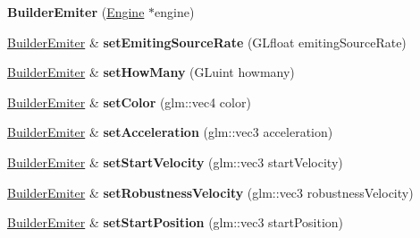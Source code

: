 \begin{DoxyCompactItemize}
\item 
\mbox{\label{classflw_1_1flf_1_1BuilderEmiter_ae0eee2b4840fa09408e0e7eead1dc694}} 
{\bfseries Builder\+Emiter} (\hyperlink{classflw_1_1Engine}{Engine} $\ast$engine)
\item 
\mbox{\label{classflw_1_1flf_1_1BuilderEmiter_a554c839b5c60595e4b1d04d9d1b9095b}} 
\hyperlink{classflw_1_1flf_1_1BuilderEmiter}{Builder\+Emiter} \& {\bfseries set\+Emiting\+Source\+Rate} (G\+Lfloat emiting\+Source\+Rate)
\item 
\mbox{\label{classflw_1_1flf_1_1BuilderEmiter_af64e3d7700f5e12fc976ea90aa518071}} 
\hyperlink{classflw_1_1flf_1_1BuilderEmiter}{Builder\+Emiter} \& {\bfseries set\+How\+Many} (G\+Luint howmany)
\item 
\mbox{\label{classflw_1_1flf_1_1BuilderEmiter_a3ffc7c438025abc17b1e1d9bee723d60}} 
\hyperlink{classflw_1_1flf_1_1BuilderEmiter}{Builder\+Emiter} \& {\bfseries set\+Color} (glm\+::vec4 color)
\item 
\mbox{\label{classflw_1_1flf_1_1BuilderEmiter_a6ca384523af8e0acdcf4bc92c19d3421}} 
\hyperlink{classflw_1_1flf_1_1BuilderEmiter}{Builder\+Emiter} \& {\bfseries set\+Acceleration} (glm\+::vec3 acceleration)
\item 
\mbox{\label{classflw_1_1flf_1_1BuilderEmiter_a157e33bb34dd0d524c701be21342f5a9}} 
\hyperlink{classflw_1_1flf_1_1BuilderEmiter}{Builder\+Emiter} \& {\bfseries set\+Start\+Velocity} (glm\+::vec3 start\+Velocity)
\item 
\mbox{\label{classflw_1_1flf_1_1BuilderEmiter_ab5fa5784fa08efb3b496efb4edbd44ca}} 
\hyperlink{classflw_1_1flf_1_1BuilderEmiter}{Builder\+Emiter} \& {\bfseries set\+Robustness\+Velocity} (glm\+::vec3 robustness\+Velocity)
\item 
\mbox{\label{classflw_1_1flf_1_1BuilderEmiter_a67415b33f24dd3546738decdf397a156}} 
\hyperlink{classflw_1_1flf_1_1BuilderEmiter}{Builder\+Emiter} \& {\bfseries set\+Start\+Position} (glm\+::vec3 start\+Position)

\end{DoxyCompactItemize}
